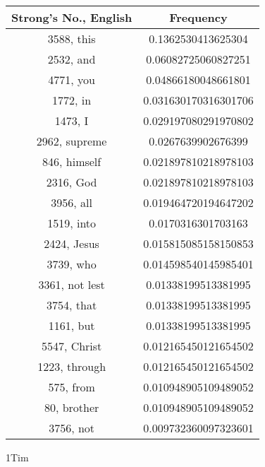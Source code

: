 \documentclass[12pt,letterpaper]{article}
\begin{document}
 \begin{longtable}{|c|c|}
\hline
 Strong's No., English & Frequency \\ \hline  
3588, this & 0.1362530413625304\\ \hline 
 2532, and & 0.06082725060827251\\ \hline 
 4771, you & 0.04866180048661801\\ \hline 
 1772, in & 0.031630170316301706\\ \hline 
 1473, I & 0.029197080291970802\\ \hline 
 2962, supreme & 0.0267639902676399\\ \hline 
 846, himself & 0.021897810218978103\\ \hline 
 2316, God & 0.021897810218978103\\ \hline 
 3956, all & 0.019464720194647202\\ \hline 
 1519, into & 0.0170316301703163\\ \hline 
 2424, Jesus & 0.015815085158150853\\ \hline 
 3739, who & 0.014598540145985401\\ \hline 
 3361, not lest & 0.01338199513381995\\ \hline 
 3754, that & 0.01338199513381995\\ \hline 
 1161, but & 0.01338199513381995\\ \hline 
 5547, Christ & 0.012165450121654502\\ \hline 
 1223, through & 0.012165450121654502\\ \hline 
 575, from & 0.010948905109489052\\ \hline 
 80, brother & 0.010948905109489052\\ \hline 
 3756, not & 0.009732360097323601\\ \hline 
\end{longtable} 
 

1Tim
\end{document}
